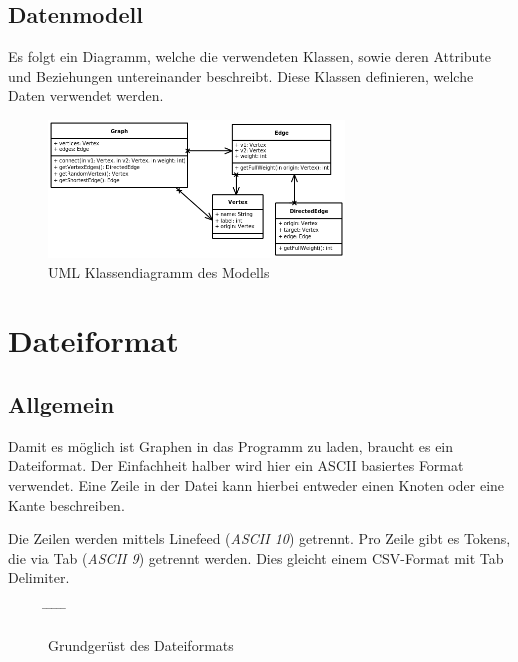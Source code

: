 \documentclass[a4paper,titlepage]{article}
\begin{document}
\clearpage

\subsection{Datenmodell}

Es folgt ein Diagramm, welche die verwendeten Klassen, sowie deren Attribute und Beziehungen untereinander beschreibt. Diese Klassen definieren, welche Daten verwendet werden.

\begin{figure}[h]
\begin{center}
	\includegraphics[width=0.7\textwidth]{model_diagram2.png}
\end{center}
\caption{UML Klassendiagramm des Modells}
\end{figure}

\newpage

\section{Dateiformat}

\subsection{Allgemein}

Damit es möglich ist Graphen in das Programm zu laden, braucht es ein Dateiformat. Der Einfachheit halber wird hier ein ASCII basiertes Format verwendet. Eine Zeile in der Datei kann hierbei entweder einen Knoten oder eine Kante beschreiben.

Die Zeilen werden mittels Linefeed (\emph{ASCII 10}) getrennt. Pro Zeile gibt es Tokens, die via Tab (\emph{ASCII 9}) getrennt werden. Dies gleicht einem CSV-Format mit Tab Delimiter.

\begin{figure}[hb]
\begin{tabbing}
	\hspace*{3em} \= \hspace{2.7em} \= \hspace{3.7em} \= \hspace{2.7em} \= \hspace{4.8em} \= \kill
	[typ] \>  \> [token] \>  \> [token\_n] \> 
\end{tabbing}
\caption{Grundgerüst des Dateiformats}
\end{figure}
\end{document}
